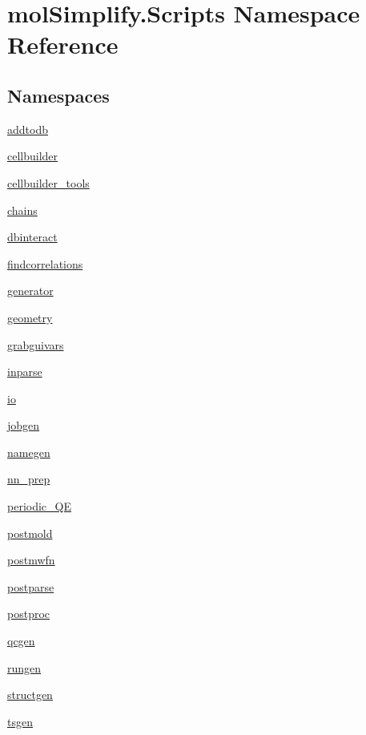 \hypertarget{namespacemolSimplify_1_1Scripts}{}\section{mol\+Simplify.\+Scripts Namespace Reference}
\label{namespacemolSimplify_1_1Scripts}
\subsection*{Namespaces}
\begin{DoxyCompactItemize}
\item 
 \hyperlink{namespacemolSimplify_1_1Scripts_1_1addtodb}{addtodb}
\item 
 \hyperlink{namespacemolSimplify_1_1Scripts_1_1cellbuilder}{cellbuilder}
\item 
 \hyperlink{namespacemolSimplify_1_1Scripts_1_1cellbuilder__tools}{cellbuilder\+\_\+tools}
\item 
 \hyperlink{namespacemolSimplify_1_1Scripts_1_1chains}{chains}
\item 
 \hyperlink{namespacemolSimplify_1_1Scripts_1_1dbinteract}{dbinteract}
\item 
 \hyperlink{namespacemolSimplify_1_1Scripts_1_1findcorrelations}{findcorrelations}
\item 
 \hyperlink{namespacemolSimplify_1_1Scripts_1_1generator}{generator}
\item 
 \hyperlink{namespacemolSimplify_1_1Scripts_1_1geometry}{geometry}
\item 
 \hyperlink{namespacemolSimplify_1_1Scripts_1_1grabguivars}{grabguivars}
\item 
 \hyperlink{namespacemolSimplify_1_1Scripts_1_1inparse}{inparse}
\item 
 \hyperlink{namespacemolSimplify_1_1Scripts_1_1io}{io}
\item 
 \hyperlink{namespacemolSimplify_1_1Scripts_1_1jobgen}{jobgen}
\item 
 \hyperlink{namespacemolSimplify_1_1Scripts_1_1namegen}{namegen}
\item 
 \hyperlink{namespacemolSimplify_1_1Scripts_1_1nn__prep}{nn\+\_\+prep}
\item 
 \hyperlink{namespacemolSimplify_1_1Scripts_1_1periodic__QE}{periodic\+\_\+\+QE}
\item 
 \hyperlink{namespacemolSimplify_1_1Scripts_1_1postmold}{postmold}
\item 
 \hyperlink{namespacemolSimplify_1_1Scripts_1_1postmwfn}{postmwfn}
\item 
 \hyperlink{namespacemolSimplify_1_1Scripts_1_1postparse}{postparse}
\item 
 \hyperlink{namespacemolSimplify_1_1Scripts_1_1postproc}{postproc}
\item 
 \hyperlink{namespacemolSimplify_1_1Scripts_1_1qcgen}{qcgen}
\item 
 \hyperlink{namespacemolSimplify_1_1Scripts_1_1rungen}{rungen}
\item 
 \hyperlink{namespacemolSimplify_1_1Scripts_1_1structgen}{structgen}
\item 
 \hyperlink{namespacemolSimplify_1_1Scripts_1_1tsgen}{tsgen}
\end{DoxyCompactItemize}
